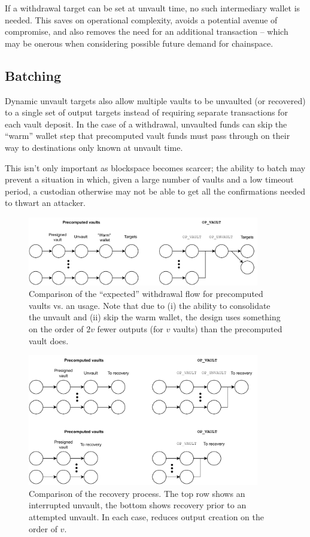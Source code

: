 \documentclass[10pt]{article}
\begin{document}
If a withdrawal target can be set at unvault time, no such intermediary wallet is
needed. This saves on operational complexity, avoids a potential avenue of compromise,
and also removes the need for an additional transaction -- which may be onerous when 
considering possible future demand for chainspace.

\subsection*{Batching}

Dynamic unvault targets also allow multiple vaults to be unvaulted (or recovered) to a
single set of output targets instead of requiring separate transactions for each vault
deposit. In the case of a withdrawal, unvaulted funds can skip the ``warm'' wallet step
that precomputed vault funds must pass through on their way to destinations
only known at unvault time. 

This isn't only important as blockspace becomes scarcer;
the ability to batch may prevent a situation in which, given a large number of vaults
and a low timeout period, a custodian otherwise may not be able to get all the
confirmations needed to thwart an attacker.

\begin{figure}[H]
\includegraphics[width=0.9\textwidth]{withdrawal-comparison.pdf}
\centering
\caption{Comparison of the ``expected'' withdrawal flow for precomputed vaults vs. an
  \opv{} usage. Note that due to (i) the ability to consolidate the unvault and (ii) skip the
  warm wallet, the \opv{} design uses something on the order of $2v$ fewer outputs (for
  $v$ vaults) than the precomputed vault does.}
\end{figure}


\begin{figure}[H]
\includegraphics[width=0.9\textwidth]{recovery-comparison.pdf}
\centering
\caption{
  Comparison of the recovery process. The top row shows an interrupted unvault, the
  bottom shows recovery prior to an attempted unvault. In each case, \opv{} reduces
  output creation on the order of $v$.
}
\end{figure}
\end{document}
